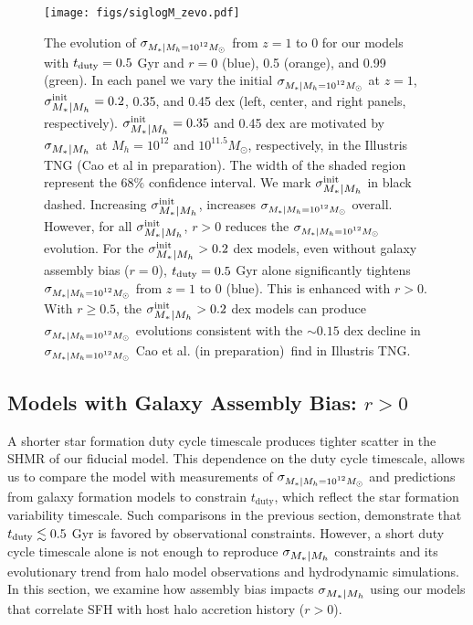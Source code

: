 \documentclass[12pt, letterpaper, preprint, tighten]{aastex62}
\newcommand{\cao}{Cao et al. (in preparation)}
\newcommand{\tduty}{t_{\rm duty}}
\newcommand{\siglogm}{\sigma_{\scaleto{M_*|M_h}{8pt}}}
\newcommand{\sigtwe}{\sigma_{\scaleto{M_*|M_h=10^{12}M_\odot}{8pt}}}
\begin{document}
\begin{figure}
\begin{center}
    \texttt{[image: figs/siglogM\_zevo.pdf]}
    \caption{The evolution of $\sigtwe$ from $z=1$ to 0 for our models with 
        $t_{\rm duty} = 0.5$ Gyr and $r = 0$ (blue), 0.5 (orange), and 0.99 (green). 
        In each panel we vary the initial $\sigtwe$ at $z=1$, $\siglogm^{\rm init} = 0.2$, 
        0.35, and 0.45 dex (left, center, and right panels, respectively). 
        $\siglogm^{\rm init} = 0.35$ and 0.45 dex are motivated by $\siglogm$ at 
        $M_h = 10^{12}$ and $10^{11.5}M_\odot$, respectively, in the Illustris TNG 
        (Cao et al in preparation). The width of the shaded region represent the $68\%$ 
        confidence interval. We mark $\siglogm^{\rm init}$ in black dashed. Increasing 
        $\siglogm^{\rm init}$, increases $\sigtwe$ overall. However, for all 
        $\siglogm^{\rm init}$, $r > 0$ reduces the $\sigtwe$ evolution. For the 
        $\siglogm^{\rm init}>0.2$ dex models, even without galaxy assembly bias ($r = 0$), 
        $\tduty = 0.5$ Gyr alone significantly tightens $\sigtwe$ from $z = 1$ to 0 (blue). 
        This is enhanced with $r > 0$. With $r \ge 0.5$, the $\siglogm^{\rm init} > 0.2$ dex 
        models can produce $\sigtwe$ evolutions consistent with the $\sim 0.15$ dex decline 
        in $\sigtwe$ \cao~find in Illustris TNG.}
    \label{fig:siglogM_zevo}
\end{center}
\end{figure}

\subsection{Models with Galaxy Assembly Bias: $r > 0$}
A shorter star formation duty cycle timescale produces tighter scatter in the
SHMR of our fiducial model. This dependence on the duty cycle timescale,
allows us to compare the model with measurements of $\sigtwe$ and predictions 
from galaxy formation models to constrain $t_\mathrm{duty}$, which reflect the 
star formation variability timescale. Such comparisons in the previous section, 
demonstrate that $t_{\rm duty} \lesssim 0.5$ Gyr is favored by observational 
constraints. However, a short duty cycle timescale alone is not enough to 
reproduce $\siglogm$ constraints and its evolutionary trend from halo model 
observations and hydrodynamic simulations. In this section, we examine how 
assembly bias impacts $\siglogm$ using our models that correlate SFH with host 
halo accretion history ($r > 0$).
\end{document}
